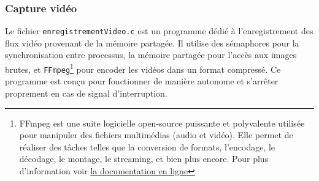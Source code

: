 \documentclass[a4paper, 11pt, french]{article}
\begin{document}
\subsubsection{Capture vidéo} \label{par:capture}

Le fichier \texttt{enregistrementVideo.c} est un programme dédié à l'enregistrement des flux vidéo provenant de la mémoire partagée. Il utilise des sémaphores pour la synchronisation entre processus, la mémoire partagée pour l'accès aux images brutes, et \texttt{FFmpeg}\footnote{FFmpeg est une suite logicielle open-source puissante et polyvalente utilisée pour manipuler des fichiers multimédias (audio et vidéo). Elle permet de réaliser des tâches telles que la conversion de formats, l'encodage, le décodage, le montage, le streaming, et bien plus encore. Pour plus d'information voir \href{https://ffmpeg.org/ffmpeg.html}{la documentation en ligne}\cite{manFFmpeg} } pour encoder les vidéos dans un format compressé. Ce programme est conçu pour fonctionner de manière autonome et s'arrêter proprement en cas de signal d'interruption.
\end{document}
